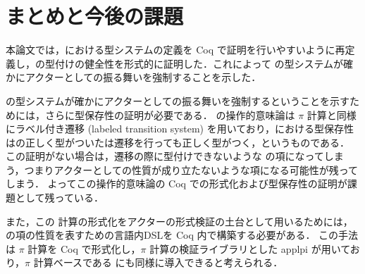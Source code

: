 








\section{まとめと今後の課題}

本論文では，\api における型システムの定義を Coq で証明を行いやすいように再定義し，\api の型付けの健全性を形式的に証明した．これによって \api の型システムが確かにアクターとしての振る舞いを強制することを示した．

\api の型システムが確かにアクターとしての振る舞いを強制するということを示すためには，さらに型保存性の証明が必要である．
\api の操作的意味論は $\pi$ 計算と同様にラベル付き遷移 (labeled transition system) を用いており，\api における型保存性は\api の正しく型がついた\conf は遷移を行っても正しく型がつく，というものである．
この証明がない場合は，遷移の際に型付けできないような \api の項になってしまう，つまりアクターとしての性質が成り立たないような項になる可能性が残ってしまう．
よってこの操作的意味論の Coq での形式化および型保存性の証明が課題として残っている．

また，この \api 計算の形式化をアクターの形式検証の土台として用いるためには，\api の項の性質を表すための言語内DSLを Coq 内で構築する必要がある．
この手法は $\pi$ 計算を Coq で形式化し，$\pi$ 計算の検証ライブラリとした applpi \cite{Affeldt200817} が用いており，$\pi$ 計算ベースである \api にも同様に導入できると考えられる．
